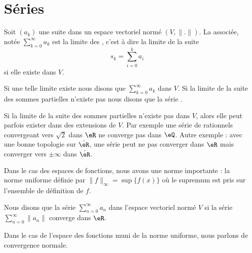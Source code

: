 \section{Séries}
\label{SECooYCQBooSZNXhd}

\begin{definition}\label{DefGFHAaOL}
Soit \( (a_k)\) une suite dans un espace vectoriel normé \( (V,\| . \| )\). La  associée, notée \( \sum_{k=0}^{\infty}a_k\) est la limite des , c'est à dire la limite de la suite
    \begin{equation}
        s_k=\sum_{i=0}^ka_i
    \end{equation}
    si elle existe dans \( V\).

    Si une telle limite existe nous disons que \( \sum_{k=0}^{\infty}a_k\)  dans \( V\). Si la limite de la suite des sommes partielles n'existe pas nous disons que la série .
\end{definition}
\begin{remark}
    Si la limite de la suite des sommes partielles n'existe pas dans \( V\), alors elle peut parfois exister dans des extensions de \( V\). Par exemple une série de rationnels convergeant vers \( \sqrt{2}\) dans \( \eR\) ne converge pas dans \( \eQ\). Autre exemple : avec une bonne topologie sur \( \bar \eR\), une série peut ne pas converger dans \( \eR\) mais converger vers \( \pm\infty\) dans \( \bar \eR\).
\end{remark}

Dans le cas des espaces de fonctions, nous avons une norme importante : la norme uniforme définie par \( \| f \|_{\infty}=\sup\{ f(x) \}\) où le supremum est pris sur l'ensemble de définition de \( f\).
\begin{definition} \label{DefVFUIXwU}
    Nous disons que la série \( \sum_{n=0}^{\infty}a_n\) dans l'espace vectoriel normé \( V\)  si la série \( \sum_{n=0}^{\infty}\| a_n \|\) converge dans \( \eR\).
\end{definition}

Dans le cas de l'espace des fonctions muni de la norme uniforme, nous parlons de convergence normale.

